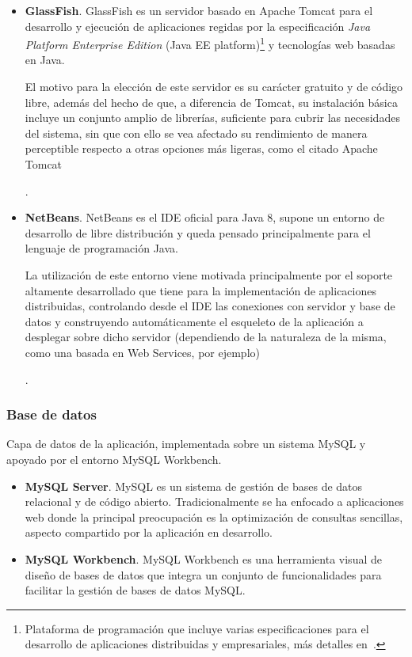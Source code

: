 \begin{itemize}
	\item{\textbf{GlassFish}. GlassFish es un servidor basado en Apache Tomcat para el desarrollo y ejecución de aplicaciones regidas por la especificación \textit{Java Platform Enterprise Edition} (Java EE platform)\footnote{Plataforma de programación que incluye varias especificaciones para el desarrollo de aplicaciones distribuidas y empresariales, más detalles en~\cite{OraEE}.} y tecnologías web basadas en Java.
	
	El motivo para la elección de este servidor es su carácter gratuito y de código libre, además del hecho de que, a diferencia de Tomcat, su instalación básica incluye un conjunto amplio de librerías, suficiente para cubrir las necesidades del sistema, sin que con ello se vea afectado su rendimiento de manera perceptible respecto a otras opciones más ligeras, como el citado Apache Tomcat}.
	
	\item{\textbf{NetBeans}. NetBeans es el IDE oficial para Java 8, supone un entorno de desarrollo de libre distribución y queda pensado principalmente para el lenguaje de programación Java.
		
	La utilización de este entorno viene motivada principalmente por el soporte altamente desarrollado que tiene para la implementación de aplicaciones distribuidas, controlando desde el IDE las conexiones con servidor y base de datos y construyendo automáticamente el esqueleto de la aplicación a desplegar sobre dicho servidor (dependiendo de la naturaleza de la misma, como una basada en Web Services, por ejemplo)}.
\end{itemize}

\subsubsection{Base de datos}

Capa de datos de la aplicación, implementada sobre un sistema MySQL y apoyado por el entorno MySQL Workbench.

\begin{itemize}
	\item \textbf{MySQL Server}. MySQL es un sistema de gestión de bases de datos relacional y de código abierto. Tradicionalmente se ha enfocado a aplicaciones web donde la principal preocupación es la optimización de consultas sencillas, aspecto compartido por la aplicación en desarrollo.	
	
	\item \textbf{MySQL Workbench}. MySQL Workbench es una herramienta visual de diseño de bases de datos que integra un conjunto de funcionalidades para facilitar la gestión de bases de datos MySQL.
\end{itemize}

